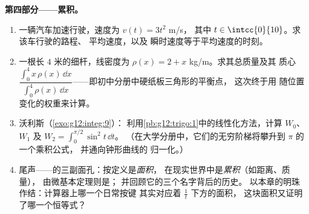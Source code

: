 \begin{problem}
\medskip
\noindent\textbf{第四部分——累积。}
\begin{enumerate}[resume]
  \item 一辆汽车加速行驶，速度为 $v(t) = 3t^2$ m/s，
        其中 $t \in \intcc{0}{10}$。求该车行驶的路程、
        平均速度，以及
        瞬时速度等于平均速度的时刻。
  \item 一根长 $4$ 米的细杆，线密度为
        $\rho(x) = 2 + x$ kg/m。求其总质量及其
        质心
        $\dfrac{\int_0^4 x\,\rho(x)\,\dd x}{\int_0^4
        \rho(x)\,\dd x}$——即初中分册中硬纸板三角形的平衡点，
        这次终于用
        随位置变化的权重来计算。
  \item 沃利斯（\cref{exo:g12:integ:9}）：
        利用\cref{pb:g12:trigo:1}中的线性化方法，计算 $W_0$、$W_1$ 及
        $W_2 = \int_0^{\pi/2} \sin^2 t\,\dd t$。
        （在大学分册中，它们的无穷阶梯将攀升到
        $\pi$ 的一个乘积公式，
        并通向钟形曲线的
        归一化。）
  \item 尾声——的三副面孔：按定义是\emph{面积}，
        在现实世界中是\emph{累积}（如距离、质量），
        由微基本定理则是\emph{}；
        并回顾它的三个名字背后的历史。
        以本章的明珠作结：计算器上哪一个日常按键
        其实对应着 $\frac1t$ 下方的面积，
        这块面积又证明了哪一个恒等式？
\end{enumerate}
\end{problem}
